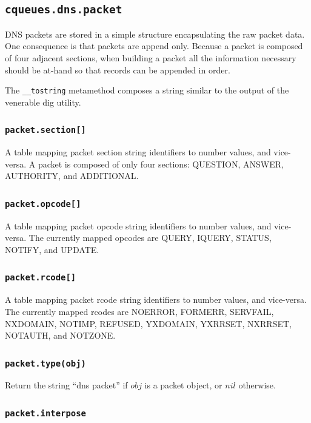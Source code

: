 \documentclass[11pt, oneside]{memoir}
\newcommand*{\routine}[1]{\texttt{#1}\xspace}
\newcommand*{\fn}[1]{\texttt{#1}\xspace}
\newcounter{toccols}
\newenvironment{Module}[1]{
	\subsection{\texttt{#1}}
	\addtocontents{toc}{
		\protect\begin{multicols}{\value{toccols}}
	}
}{
	\addtocontents{toc}{\protect\end{multicols}}
}
\begin{document}
\begin{Module}{cqueues.dns.packet}

DNS packets are stored in a simple structure encapsulating the raw packet data. One consequence is that packets are append only. Because a packet is composed of four adjacent sections, when building a packet all the information necessary should be at-hand so that records can be appended in order.

The \fn{\_\_tostring} metamethod composes a string similar to the output of the venerable dig utility.

\subsubsection[\fn{packet.section[]}]{\fn{packet.section[]}}

A table mapping packet section string identifiers to number values, and vice-versa. A packet is composed of only four sections: QUESTION, ANSWER, AUTHORITY, and ADDITIONAL.

\subsubsection[\fn{packet.opcode[]}]{\fn{packet.opcode[]}}

A table mapping packet opcode string identifiers to number values, and vice-versa. The currently mapped opcodes are QUERY, IQUERY, STATUS, NOTIFY, and UPDATE.

\subsubsection[\fn{packet.rcode[]}]{\fn{packet.rcode[]}}

A table mapping packet rcode string identifiers to number values, and vice-versa. The currently mapped rcodes are NOERROR, FORMERR, SERVFAIL, NXDOMAIN, NOTIMP, REFUSED, YXDOMAIN, YXRRSET, NXRRSET, NOTAUTH, and NOTZONE.

\subsubsection[\routine{packet.type}]{\routine{packet.type(obj)}}
Return the string ``dns packet'' if $obj$ is a packet object, or $nil$ otherwise.

\subsubsection[\fn{packet.interpose}]{\fn{packet.interpose}}


\end{Module}
\end{document}
